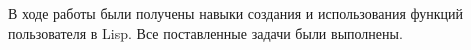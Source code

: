 \Conclusion

В ходе работы были получены навыки создания и использования функций пользователя в Lisp. Все поставленные задачи были выполнены.
